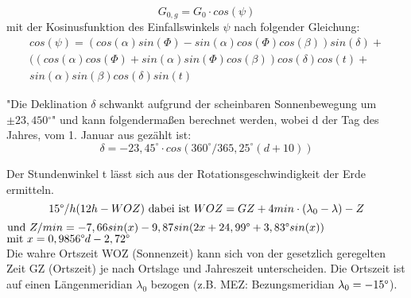       \begin{equation}
          G_{0,g} = G_0 \cdot cos(\psi)	
          \label{Eq:G0g}
      \end{equation}
      mit der Kosinusfunktion des Einfallswinkels $\psi$ nach folgender Gleichung:
      \begin{multline}
          cos(\psi) = (cos(\alpha) sin(\Phi) - sin(\alpha) cos(\Phi) cos(\beta)) sin(\delta) + \\
          ((cos(\alpha) cos(\Phi) + sin(\alpha) sin(\Phi) cos(\beta)) cos(\delta) cos(t) + \\ 
          sin(\alpha) sin(\beta) cos(\delta) sin(t) 
          \label{Eq:cospsi}
      \end{multline}

      "Die Deklination $\delta$ schwankt aufgrund der scheinbaren Sonnenbewegung um $\pm 23,450 {^\circ}$"\cite{REN2} und kann folgendermaßen berechnet werden, wobei d der Tag des Jahres, vom 1. Januar aus gezählt ist: \\ 
      \begin{equation}
          \delta = -23,45^{\circ} \cdot cos(360^{\circ} /365,25^{\circ} (d+10)) 
      \end{equation}

      Der Stundenwinkel t lässt sich aus der Rotationsgeschwindigkeit der Erde ermitteln.
      \begin{equation}
          15\degree/h (12h - WOZ) ~\text{dabei ist}~ WOZ = GZ + 4 min \cdot (\lambda_0 - \lambda) - Z
      \end{equation} 
      $ \text{und } Z/min = -7,66 sin(x) - 9,87 sin( 2x + 24,99\degree + 3,83\degree sin(x))$ \\
      $ \text{mit }x = 0,9856\degree d-2,72\degree$ \\

      Die wahre Ortszeit WOZ (Sonnenzeit) kann sich von der gesetzlich geregelten Zeit GZ (Ortszeit) je nach Ortslage und Jahreszeit unterscheiden. Die Ortszeit ist auf einen Längenmeridian $\lambda_0$ bezogen (z.B. MEZ: Bezungsmeridian $\lambda_0 = -15\degree$). \\
	
